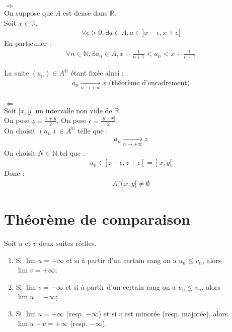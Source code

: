 \documentclass[../main.tex]{subfiles}
\begin{document}
$\boxed{\Rightarrow}$ \\
On suppose que $A$ est dense dans $\mathbb{R}$. \\
Soit $x \in \mathbb{R}$. 
\begin{align*}
    \forall \epsilon > 0, \exists a \in A, a \in ]x-\epsilon, x+\epsilon[
\end{align*}
En particulier : 
\begin{align*}
    \forall n \in \mathbb{N}, \exists a_n \in A, x - \frac{1}{n+1} < a_n < x + \frac{1}{n+1}
\end{align*}

La suite $(a_n) \in A^{\mathbb{N}}$ étant fixée ainsi : 
\begin{align*}
    a_n \underset{n \to +\infty}{\longrightarrow} x \text{ (théorème d'encadrement)}
\end{align*} \\

$\boxed{\Leftarrow}$ \\
Soit $]x, y[$ un intervalle non vide de $\mathbb{R}$. \\
On pose $z = \frac{x + y}{2}$. On pose $\epsilon = \frac{|y-x|}{2}$. \\
On choisit $(a_n) \in A^{\mathbb{N}}$ telle que :
\begin{align*}
    a_n \underset{n \to +\infty}{\longrightarrow} z
\end{align*}
On choisit $N \in \mathbb{N}$ tel que : 
\begin{align*}
    a_n \in ]z-\epsilon, z+\epsilon[ = ]x, y[
\end{align*}
Donc : 
\begin{align*}
    \boxed{A \cap ]x, y[ \neq \emptyset}
\end{align*}

\setcounter{section}{47}
\section{Théorème de comparaison}
\begin{tcolorbox}[title=Théorème 14.48, title filled=false, colframe=orange, colback=orange!10!white]
    Soit $u$ et $v$ deux suites réelles. 
    \begin{enumerate}
        \item Si $\lim u = +\infty$ et si à partir d'un certain rang on a $u_n \leq v_n$, alors $\lim v = + \infty$;
        \item Si $\lim v = -\infty$ et si à partir d'un certain rang on a $u_n \leq v_n$, alors $\lim u = - \infty$;
        \item Si $\lim u = +\infty$ (resp. $-\infty$) et si $v$ est minorée (resp. majorée), alors $\lim u + v = +\infty$ (resp. $-\infty$).
    \end{enumerate}
\end{tcolorbox}
\end{document}
